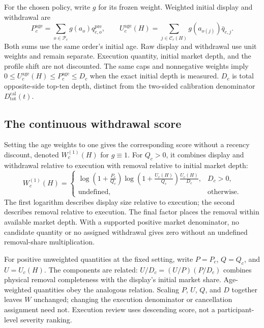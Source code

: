For the chosen policy, write $g$ for its frozen weight. Weighted initial display and withdrawal are
\begin{equation}
    P_c^{\mathrm{age}}=\sum_{o\in\mathcal P_c}g(a_o)q^{\mathrm{pre}}_{c,o},
    \qquad
    U_c^{\mathrm{age}}(H)=\sum_{j\in\mathcal C_c(H)}g(a_{o(j)})\bar q_{c,j}.
    \label{eq:shared_age_display_withdrawal}
\end{equation}
Both sums use the same order's initial age. Raw display and withdrawal use unit weights and remain separate. Execution quantity, initial market depth, and the profile shift are not discounted. The same caps and nonnegative weights imply $0\leq U_c^{\mathrm{age}}(H)\leq P_c^{\mathrm{age}}\leq D_c$ when the exact initial depth is measured. $D_c$ is total opposite-side top-ten depth, distinct from the two-sided calibration denominator $D_{\mathrm{tot}}^{\mathrm{cal}}(t)$.

\subsection{The continuous withdrawal score}
Setting the age weights to one gives the corresponding score without a recency discount, denoted $W_c^{(1)}(H)$ for $g\equiv1$. For $Q_c>0$, it combines display and withdrawal relative to execution with removal relative to initial market depth:
\begin{equation}
    W_c^{(1)}(H)
    =
    \begin{cases}
    \displaystyle
    \log\!\left(1+\frac{P_c}{Q_c}\right)
    \log\!\left(1+\frac{U_c(H)}{Q_c}\right)
    \frac{U_c(H)}{D_c},
    & D_c>0,\\[5pt]
    \text{undefined},&\text{otherwise}.
    \end{cases}
    \label{eq:wmsci}
\end{equation}
The first logarithm describes display size relative to execution; the second describes removal relative to execution. The final factor places the removal within available market depth. With a supported positive market denominator, no candidate quantity or no assigned withdrawal gives zero without an undefined removal-share multiplication.

For positive unweighted quantities at the fixed setting, write $P=P_c$, $Q=Q_c$, and $U=U_c(H)$. The components are related: $U/D_c=(U/P)(P/D_c)$ combines physical removal completeness with the display's initial market share. Age-weighted quantities obey the analogous relation. Scaling $P$, $U$, $Q$, and $D$ together leaves $W$ unchanged; changing the execution denominator or cancellation assignment need not. Execution review uses descending score, not a participant-level severity ranking.


